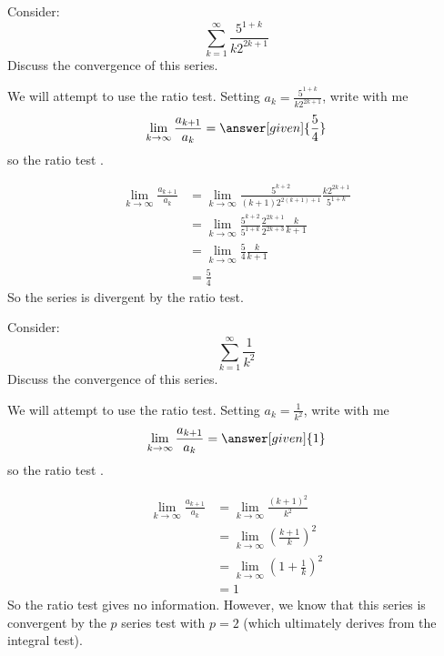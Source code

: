\documentclass{ximera}
\begin{document}
\begin{example}
  Consider:
  \[
  \sum_{k=1}^\infty \frac{5^{1+k}}{k 2^{2k+1}}
  \]
  Discuss the convergence of this series.
  \begin{explanation}
    We will attempt to use the ratio test. Setting $a_k =
    \frac{5^{1+k}}{k 2^{2k+1}}$, write with me
    \[
    \lim_{k \to \infty} \frac{a_{k+1}}{a_k} = \answer[given]{\frac{5}{4}}
    \]
    so the ratio test
    . 
    \begin{hint}
      \begin{align*}
	\lim_{k \to \infty} \frac{a_{k+1}}{a_k} &= \lim_{k \to \infty} \frac{5^{k+2}}{(k+1)2^{2(k+1)+1}} \frac{k 2^{2k+1}}{5^{1+k}}\\
	&=\lim_{k \to \infty} \frac{5^{k+2}}{5^{1+k}} \frac{2^{2k+1}}{2^{2k+3}} \frac{k}{k+1}\\
	&=\lim_{k \to \infty} \frac{5}{4} \frac{k}{k+1}\\
	&=\frac{5}{4}
      \end{align*}	
      So the series is divergent by the ratio test.
    \end{hint}
  \end{explanation}
\end{example}


\begin{example}
  Consider:	
  \[
  \sum_{k=1}^\infty \frac{1}{k^2}
  \]
  Discuss the convergence of this series.
  \begin{explanation}
    We will attempt to use the ratio test. Setting $a_k =
    \frac{1}{k^2}$, write with me
    \[ 
    \lim_{k \to \infty} \frac{a_{k+1}}{a_k} = \answer[given]{1}	
    \]
    so the ratio test
    .		
    \begin{hint}
      \begin{align*}
	\lim_{k \to \infty} \frac{a_{k+1}}{a_k} &= \lim_{k \to \infty} \frac{(k+1)^2}{k^2}\\
	&= \lim_{k \to \infty} \left( \frac{k+1}{k}\right)^2\\
	&= \lim_{k \to \infty} \left( 1+\frac{1}{k}\right)^2\\
	&= 1
      \end{align*}
      So the ratio test gives no information.  However, we know that
      this series is convergent by the $p$ series test with $p=2$
      (which ultimately derives from the integral test).
    \end{hint}
  \end{explanation}
\end{example}
\end{document}
